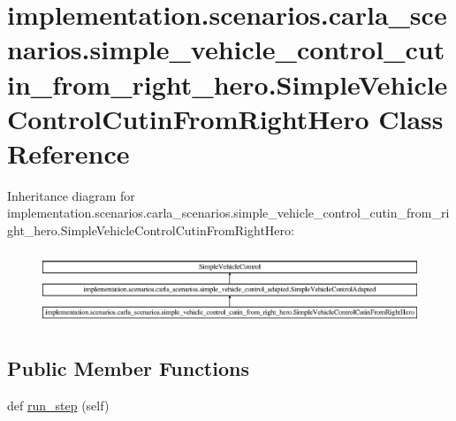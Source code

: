 \hypertarget{classimplementation_1_1scenarios_1_1carla__scenarios_1_1simple__vehicle__control__cutin__from__r6474a3ad40f8613a989008f8fef990bd}{}\section{implementation.\+scenarios.\+carla\+\_\+scenarios.\+simple\+\_\+vehicle\+\_\+control\+\_\+cutin\+\_\+from\+\_\+right\+\_\+hero.\+Simple\+Vehicle\+Control\+Cutin\+From\+Right\+Hero Class Reference}
\label{classimplementation_1_1scenarios_1_1carla__scenarios_1_1simple__vehicle__control__cutin__from__r6474a3ad40f8613a989008f8fef990bd}
Inheritance diagram for implementation.\+scenarios.\+carla\+\_\+scenarios.\+simple\+\_\+vehicle\+\_\+control\+\_\+cutin\+\_\+from\+\_\+right\+\_\+hero.\+Simple\+Vehicle\+Control\+Cutin\+From\+Right\+Hero\+:\begin{figure}[H]
\begin{center}
\leavevmode
\includegraphics[height=2.213439cm]{classimplementation_1_1scenarios_1_1carla__scenarios_1_1simple__vehicle__control__cutin__from__r6474a3ad40f8613a989008f8fef990bd}
\end{center}
\end{figure}
\subsection*{Public Member Functions}
\begin{DoxyCompactItemize}
\item 
def \hyperlink{classimplementation_1_1scenarios_1_1carla__scenarios_1_1simple__vehicle__control__cutin__from__r6474a3ad40f8613a989008f8fef990bd_a43f2d387cd473b56e2e2739b10ee8b27}{run\+\_\+step} (self)
\end{DoxyCompactItemize}


